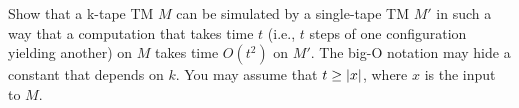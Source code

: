\begin{problem}
  Show that a k-tape TM $M$ can be simulated by a single-tape TM $M'$
  in such a way that a computation that takes time $t$
  (i.e., $t$ steps of one configuration yielding another)
  on $M$ takes time $O(t^2)$ on $M'$.
  The big-O notation may hide a constant that depends on $k$.
  You may assume that $t \geq \lvert x\rvert$, where $x$ is the input to $M$.
\end{problem}

